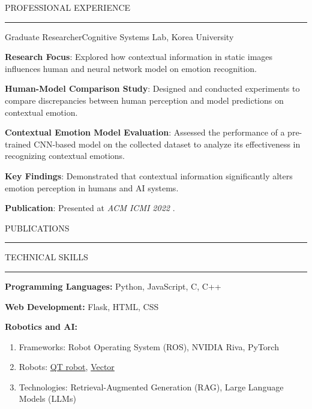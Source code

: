 \documentclass{resume} %
\renewenvironment{rSection}[1]{
\sectionskip
\textcolor{CarnegieMellonRed}{\MakeUppercase{#1}}
\sectionlineskip
\hrule
\begin{list}{}{
\setlength{\leftmargin}{1.5em}
}
\item[]
}{
\end{list}
}
\begin{document}
\begin{rSection}{Professional Experience}
\begin{rSubsection}{Graduate Researcher}{Cognitive Systems Lab, Korea University}{}{}
    \item \textbf{Research Focus}: Explored how contextual information in static images influences human and neural network model on emotion recognition.
    \item \textbf{Human-Model Comparison Study}:  Designed and conducted experiments to compare discrepancies between human perception and model predictions on contextual emotion.
    \item \textbf{Contextual Emotion Model Evaluation}: Assessed the performance of a pre-trained CNN-based model on the collected dataset to analyze its effectiveness in recognizing contextual emotions.
    \item \textbf{Key Findings}: Demonstrated that contextual information significantly alters emotion perception in humans and AI systems.
    \item \textbf{Publication}: Presented at \emph{ACM ICMI 2022} \cite{shin2022contextual}.
\end{rSubsection}

\end{rSection}

\begin{rSection}{Publications} \itemsep -2pt

\leavevmode\printbibliography[heading=none]
\nocite{shin2022contextual, shin2023robot,shin2023hierarchies,kwon2023heterogeneous}

\end{rSection}

\begin{rSection}{TECHNICAL SKILLS} \itemsep -2pt

 \item \textbf{Programming Languages:} Python, JavaScript, C, C++
 \item \textbf{Web Development:} Flask, HTML, CSS
 \item \textbf{Robotics and AI:}
        \begin{enumerate}
         \item [] Frameworks: Robot Operating System (ROS), NVIDIA Riva, PyTorch
         \item[] Robots: \href{https://luxai.com/humanoid-social-robot-for-research-and-teaching/?_gl=1*1pa3d5s*_ga*ODAwNzg4NzQ4LjE3NDA5NDQ2Nzk.*_ga_8DZ26Q75JD*MTc0NDgyMjEzMS4xMS4xLjE3NDQ4MjMzMjQuNDYuMC4w}{QT robot}, \href{https://anki.bot/products/vector-robot}{Vector}
         \item[] Technologies: Retrieval-Augmented Generation (RAG), Large Language Models (LLMs)
       \end{enumerate}
  
\end{rSection}
\end{document}
